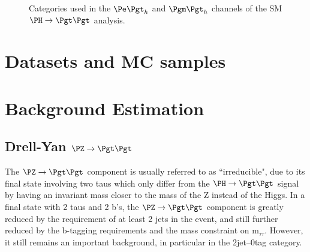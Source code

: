\begin{figure}[htb]
\begin{center}

\end{center}
\caption{
 Categories used in the $\etau$ and $\mutau$ channels of the \ac{SM}
 $\HToTauTau$ analysis.  
}
\label{fig:transversemass}
\end{figure}
\section{Datasets and \ac{MC} samples}
\label{sec:dataandMC}


\section{Background Estimation}
\label{sec:backgrounds}

\subsection{Drell-Yan $\PZ \to\Pgt\Pgt$}
\label{sec:backgroundEstimation_Ztautau}

The $\PZ \to \Pgt\Pgt$ component is usually referred to as ``irreducible", due to its final
state involving two taus which only differ from the $\PH \to \Pgt\Pgt$ signal by
having an invariant mass closer to the mass of the Z instead of the Higgs. In
a final state with 2 taus and 2 b's, the $\PZ \to \Pgt\Pgt$ component is greatly reduced
by the requirement of at least 2 jets in the event, and still further reduced by
the b-tagging requirements and the mass constraint on m$_{\tau\tau}$.
However, it still remains an important background, in particular in the 2jet--0tag category. 

